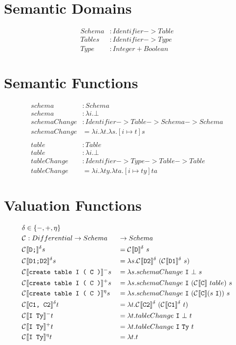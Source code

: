 \documentclass[12pt]{article}
\begin{document}
\section{Semantic Domains}
\begin{align*}
  Schema &: Identifier -> Table \\
  Tables &: Identifier -> Type \\
  Type &: Integer + Boolean
\end{align*}

\section{Semantic Functions}
\begin{align*}
  schema &: Schema \\
  schema &: \lambda i.\bot \\
  schemaChange &: Identifier -> Table -> Schema -> Schema \\
  schemaChange &= \lambda i. \lambda t. \lambda s. [ i \mapsto t ]s \\
  \\
  table &: Table \\
  table &: \lambda i.\bot \\
  tableChange &: Identifier -> Type -> Table -> Table \\
  tableChange &= \lambda i. \lambda ty. \lambda ta. [ i \mapsto ty ]ta
\end{align*}

\section{Valuation Functions}

\begin{alignat*}{2}
  &\delta \in \{-, +, \eta \} &&\\
  &\compsymbol : Differential -> Schema &&-> Schema \\
  &\comp{D;}{}^{\delta}s &&= \comp{D}{}^{\delta}\ s \\
  &\comp{D1;D2}{}^{\delta}s &&= \lambda s.\comp{D2}{}^{\delta}\ (\comp{D1}{}^{\delta}\ s) \\
  &\comp{create table I ( C )}{}^{-}s &&= \lambda s. schemaChange\ \mathtt{I}\ \bot\ s \\
  &\comp{create table I ( C )}{}^{+}s &&= \lambda s. schemaChange\ \mathtt{I}\ (\comp{C}{}\ table)\ s \\
  &\comp{create table I ( C )}{}{}^{\eta}s &&= \lambda s. schemaChange\ \mathtt{I}\ (\comp{C}{} (s\ \mathtt{I}))\ s\\
  &\comp{C1, C2}{}^{\delta}t &&= \lambda t.\comp{C2}{}^{\delta}\ (\comp{C1}{}^{\delta}\ t) \\
  &\comp{I Ty}{}^{-}t &&= \lambda t.tableChange\ \mathtt{I}\ \bot\ t \\
  &\comp{I Ty}{}^{+}t &&= \lambda t.tableChange\ \mathtt{I}\ \mathtt{Ty}\ t \\
  &\comp{I Ty}{}^{\eta}t &&= \lambda t. t \\
\end{alignat*}
\end{document}
